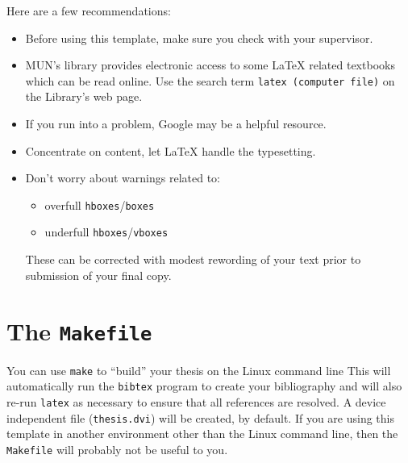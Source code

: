 Here are a few recommendations:

\begin{itemize}
	\item Before using this template, make sure you check with
		your supervisor.
	\item MUN's library provides electronic access to some \LaTeX{}
		related textbooks which can be read online.  Use
		the search term \texttt{latex (computer file)} on the
		Library's web page.
	\item If you run into a problem, Google may be a helpful resource.
	\item Concentrate on content, let \LaTeX{} handle the typesetting.
	\item Don't worry about warnings related to:
	\begin{itemize}
		\item overfull \texttt{hboxes}/\texttt{boxes}
		\item underfull \texttt{hboxes}/\texttt{vboxes}
	\end{itemize}
	These can be corrected with modest rewording of your text prior
	to submission of your final copy.
\end{itemize}

\section{The \texttt{Makefile}}

You can use \texttt{make} to ``build'' your thesis on the Linux command
line This will
automatically run the \texttt{bibtex} program to create your bibliography
and will also re-run \texttt{latex} as necessary to ensure that all
references are resolved.  A device independent file (\texttt{thesis.dvi})
will be created, by default.  If you are using this template in another
environment other than the Linux command line, then the \texttt{Makefile}
will probably not be useful to you.


